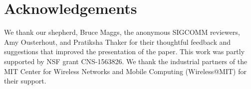 \section*{Acknowledgements}

We thank our shepherd, Bruce Maggs, the anonymous SIGCOMM reviewers, Amy
Ousterhout, and Pratiksha Thaker for their thoughtful feedback and suggestions
that improved the presentation of the paper. This work was partly supported by
NSF grant CNS-1563826. We thank the industrial partners of the MIT Center for
Wireless Networks and Mobile Computing (Wireless@MIT) for their support.
